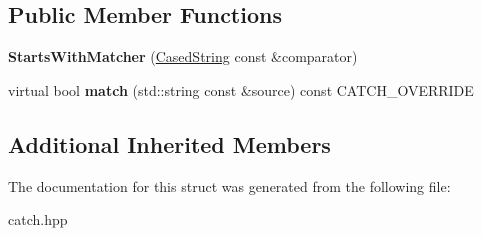 \subsection*{Public Member Functions}
\begin{DoxyCompactItemize}
\item 
\mbox{\label{structCatch_1_1Matchers_1_1StdString_1_1StartsWithMatcher_a7b86f258bdbd131a6e7bcd94a8977325}} 
{\bfseries Starts\+With\+Matcher} (\hyperlink{structCatch_1_1Matchers_1_1StdString_1_1CasedString}{Cased\+String} const \&comparator)
\item 
\mbox{\label{structCatch_1_1Matchers_1_1StdString_1_1StartsWithMatcher_a0d37b1ddba7f1031e360ccd475f05d0d}} 
virtual bool {\bfseries match} (std\+::string const \&source) const C\+A\+T\+C\+H\+\_\+\+O\+V\+E\+R\+R\+I\+DE
\end{DoxyCompactItemize}
\subsection*{Additional Inherited Members}


The documentation for this struct was generated from the following file\+:\begin{DoxyCompactItemize}
\item 
catch.\+hpp\end{DoxyCompactItemize}
